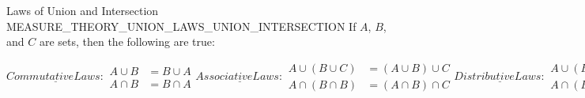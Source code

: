 \documentclass[crop=false,class=book,oneside]{standalone}
\begin{document}
            \begin{ftheorem}{Laws of Union and Intersection}
                            {MEASURE_THEORY_UNION_LAWS_UNION_INTERSECTION}
                If $A$, $B$, and $C$ are sets, then the following are true:
                \par\hfill\par
                \begin{subequations}
                    \underline{Commutative Laws:}
                    \begin{align}
                        A\cup{B}&=B\cup{A}\\
                        A\cap{B}&=B\cap{A}
                    \end{align}
                    \underline{Associative Laws:}
                    \begin{align}
                        A\cup(B\cup{C})&=(A\cup{B})\cup{C}\\
                        A\cap(B\cap{B})&=(A\cap{B})\cap{C}
                    \end{align}
                    \underline{Distributive Laws:}
                    \begin{align}
                        A\cup(B\cap{C})&=(A\cup{B})\cap(A\cup{C})\\
                        A\cap(B\cup{C})&=(A\cap{B})\cup(A\cap{C})
                    \end{align}
                \end{subequations}
            \end{ftheorem}
\end{document}
